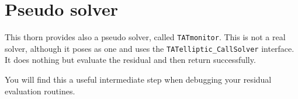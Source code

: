 \section{Pseudo solver}

This thorn provides also a pseudo solver, called \texttt{TATmonitor}.
This is not a real solver, although it poses as one and uses the
\texttt{TATelliptic\_CallSolver} interface.  It does nothing but
evaluate the residual and then return successfully.

You will find this a useful intermediate step when debugging your
residual evaluation routines.







